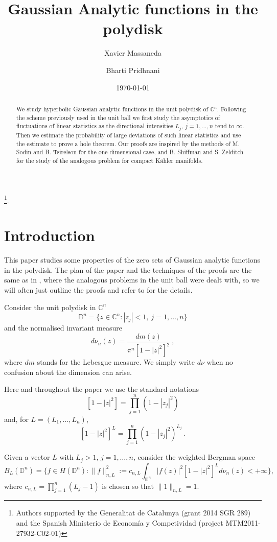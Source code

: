 \documentclass[12pt,twoside,final,amsfonts]{amsart}
\title[Gaussian Analytic functions in the polydisk]
{Gaussian Analytic functions in the polydisk}
\author[Xavier Massaneda] {Xavier Massaneda}
\author[Bharti Pridhnani] {Bharti Pridhnani}
\date{\today}
\theoremstyle{plain}
\theoremstyle{definition}
\theoremstyle{definition}
\begin{document}
\thanks{Authors supported by the Generalitat de Catalunya (grant 2014 SGR 289)  and the Spanish Ministerio de Econom\'ia y Competividad (project MTM2011-27932-C02-01)}.

\begin{abstract}
We study hyperbolic Gaussian analytic functions in the unit polydisk of ${\mathbb{C}}^n$. Following the scheme previously used in the unit ball we first study the asymptotics of fluctuations of linear statistics as the directional intensities $L_j$, $j=1,\dots,n$ tend to $\infty$. Then we estimate the probability of large deviations of such linear statistics and use the estimate to prove a hole theorem. Our proofs are inspired by the methods of M. Sodin and B. Tsirelson for the one-dimensional case, and B. Shiffman and S. Zelditch for the study of the analogous problem for compact K\"ahler manifolds. 
\end{abstract}

\maketitle

\section*{Introduction}

This paper studies some properties of the zero sets of Gaussian analytic functions in the polydisk. The plan of the paper and the techniques of the proofs are the same as in \cite{BMP}, where the analogous problems in the unit ball were dealt with, so we will often just outline the proofs and refer to \cite{BMP} for the details.

Consider the unit polydisk in $\mathbb C^n$
\[
 \mathbb D^n=\bigl\{z\in{\mathbb{C}}^n : |z_j|<1, \ j=1,\dots, n\bigr\}
\]
and the normalised invariant measure 
\[
 d\nu_n(z)=\frac{dm(z)}{\pi^n [1-|z|^2]^2}\ ,
\]
where $dm$ stands for the Lebesgue measure. We simply write $d\nu$ when no confusion about the dimension can arise.

Here and throughout the paper we use the standard notations
\[
 [1-|z|^2]=\prod_{j=1}^n (1-|z_j|^2)
\]
and, for $L=(L_1,\dots,L_n)$, 
\[
 [1-|z|^2]^L=\prod_{j=1}^n (1-|z_j|^2)^{L_j}\ .
\]

Given a vector $L$ with $L_j>1$, $j=1,\dots, n$, consider the weighted Bergman space
\[
 B_L(\mathbb D^n)=\bigl\{f\in H({\mathbb{D}}^n) : \|f\|_{n,L}^2:=c_{n,L} \int_{{\mathbb{D}}^n} |f(z)|^2 [1-|z|^2]^{L}  d\nu_n(z)< +\infty\bigr\} ,
\]
where $c_{n,L}=\prod_{j=1}^n(L_j-1)$ is chosen so that $\|1\|_{n,L}=1$.
\end{document}
